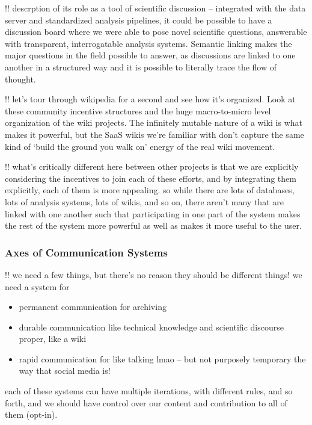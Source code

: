\documentclass[10pt]{article}
\begin{document}
\begin{multicols}{2}
!! descrption of its role as a tool of scientific discussion --
integrated with the data server and standardized analysis pipelines, it
could be possible to have a discussion board where we were able to pose
novel scientific questions, answerable with transparent, interrogatable
analysis systems. Semantic linking makes the major questions in the
field possible to answer, as discussions are linked to one another in a
structured way and it is possible to literally trace the flow of
thought.

!! let's tour through wikipedia for a second and see how it's organized.
Look at these community incentive structures and the huge macro-to-micro
level organization of the wiki projects. The infinitely mutable nature
of a wiki is what makes it powerful, but the SaaS wikis we're familiar
with don't capture the same kind of `build the ground you walk on'
energy of the real wiki movement.

!! what's critically different here between other projects is that we
are explicitly considering the incentives to join each of these efforts,
and by integrating them explicitly, each of them is more appealing. so
while there are lots of databases, lots of analysis systems, lots of
wikis, and so on, there aren't many that are linked with one another
such that participating in one part of the system makes the rest of the
system more powerful as well as makes it more useful to the user.

\hypertarget{axes-of-communication-systems}{%
\subsubsection{Axes of Communication
Systems}\label{axes-of-communication-systems}}

!! we need a few things, but there's no reason they should be different
things! we need a system for

\begin{itemize}

\item
  permanent communication for archiving
\item
  durable communication like technical knowledge and scientific
  discourse proper, like a wiki
\item
  rapid communication for like talking lmao -- but not purposely
  temporary the way that social media is!
\end{itemize}

each of these systems can have multiple iterations, with different
rules, and so forth, and we should have control over our content and
contribution to all of them (opt-in).


\end{multicols}
\end{document}

